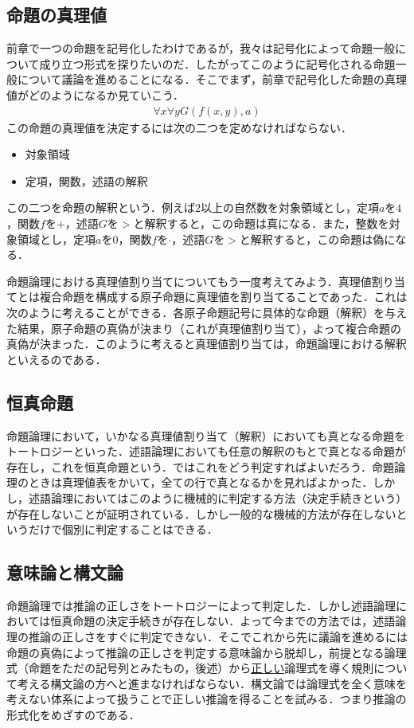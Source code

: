\documentclass[10pt,b5paper,papersize,dvipdfmx]{jsbook}
\begin{document}
\subsection{命題の真理値}
前章で一つの命題を記号化したわけであるが，我々は記号化によって命題一般について成り立つ形式を探りたいのだ．したがってこのように記号化される命題一般について議論を進めることになる．そこでまず，前章で記号化した命題の真理値がどのようになるか見ていこう．
\begin{align*}
\forall x\forall yG(f(x,y),a)
\end{align*}
この命題の真理値を決定するには次の二つを定めなければならない．
\begin{itemize}
\item 対象領域
\item 定項，関数，述語の解釈
\end{itemize}
この二つを命題の解釈という．例えば$2$以上の自然数を対象領域とし，定項$a$を$4$，関数$f$を$+$，述語$G$を$>$と解釈すると，この命題は真になる．また，整数を対象領域とし，定項$a$を$0$，関数$f$を$\cdot$，述語$G$を$>$と解釈すると，この命題は偽になる． \par
命題論理における真理値割り当てについてもう一度考えてみよう．真理値割り当てとは複合命題を構成する原子命題に真理値を割り当てることであった．これは次のように考えることができる．各原子命題記号に具体的な命題（解釈）を与えた結果，原子命題の真偽が決まり（これが真理値割り当て），よって複合命題の真偽が決まった．このように考えると真理値割り当ては，命題論理における解釈といえるのである．

\subsection{恒真命題}
命題論理において，いかなる真理値割り当て（解釈）においても真となる命題をトートロジーといった．述語論理においても任意の解釈のもとで真となる命題が存在し，これを恒真命題という．ではこれをどう判定すればよいだろう．命題論理のときは真理値表をかいて，全ての行で真となるかを見ればよかった．しかし，述語論理においてはこのように機械的に判定する方法（決定手続きという）が存在しないことが証明されている．しかし一般的な機械的方法が存在しないというだけで個別に判定することはできる．

\subsection{意味論と構文論}
命題論理では推論の正しさをトートロジーによって判定した．しかし述語論理においては恒真命題の決定手続きが存在しない．よって今までの方法では，述語論理の推論の正しさをすぐに判定できない．そこでこれから先に議論を進めるには命題の真偽によって推論の正しさを判定する意味論から脱却し，前提となる論理式（命題をただの記号列とみたもの，後述）から\underline{正しい}論理式を導く規則について考える構文論の方へと進まなければならない．構文論では論理式を全く意味を考えない体系によって扱うことで正しい推論を得ることを試みる．つまり推論の形式化をめざすのである．
\end{document}
